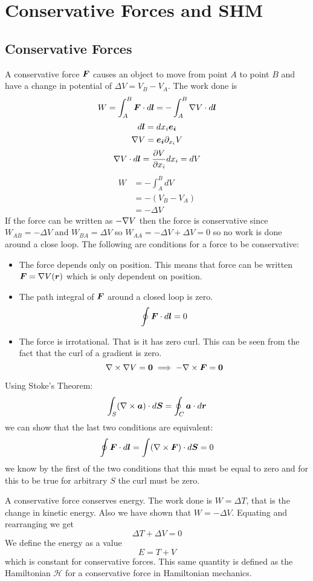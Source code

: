 \documentclass{article}
\newcommand{\pdvx}[1]{\partial_{x_{#1}}}
\begin{document}
    \section{Conservative Forces and SHM}
    \subsection{Conservative Forces}
    A conservative force \(\bm{F}\) causes an object to move from point \(A\) to point \(B\) and have a change in potential of \(\Delta V = V_B - V_A\).
    The work done is
    \[W = \int_A^B\bm{F}\cdot d\bm{l} = -\int_A^B\nabla V\cdot d\bm{l}\]
    \[d\bm{l} = dx_i\bm{e_{i}}\]
    \[\grad V = \ve i\pdvx i V\]
    \[\nabla V\cdot d\bm{l} = \pdv{V}{x_i}dx_i = dV\]
    \begin{align*}
        W &= -\int_A^B dV\\
        &= -(V_B - V_A)\\
        &= -\Delta V
    \end{align*}
    If the force can be written as \(-\nabla V\) then the force is conservative since \(W_{AB} = -\Delta V\) and \(W_{BA} = \Delta V\) so \(W_{AA} = -\Delta V + \Delta V = 0\) so no work is done around a close loop.
    The following are conditions for a force to be conservative:
    \begin{itemize}
        \item The force depends only on position.
        This means that force can be written \(\bm{F} = \nabla V(\bm{r})\) which is only dependent on position.
        \item The path integral of \(\bm{F}\) around a closed loop is zero.
        \[\oint \bm{F}\cdot d\bm{l} = 0\]
        \item The force is irrotational.
        That is it has zero curl.
        This can be seen from the fact that the curl of a gradient is zero.
        \[\nabla\times\nabla V = \bm{0} \implies -\nabla\times\bm{F} = \bm{0}\]
    \end{itemize}
    Using Stoke's Theorem:
    \[\int_S (\nabla\times\bm{a})\cdot d\bm{S} = \oint_C \bm{a}\cdot d\bm{r}\]
    we can show that the last two conditions are equivalent:
    \[\oint \bm{F}\cdot d\bm{l} = \int (\nabla\times\bm{F})\cdot d\bm{S} = 0\]
    we know by the first of the two conditions that this must be equal to zero and for this to be true for arbitrary \(S\) the curl must be zero.
    
    A conservative force conserves energy.
    The work done is \(W = \Delta T\), that is the change in kinetic energy.
    Also we have shown that \(W = -\Delta V\).
    Equating and rearranging we get
    \[\Delta T + \Delta V = 0\]
    We define the energy as a value
    \[E = T + V\]
    which is constant for conservative forces.
    This same quantity is defined as the Hamiltonian \(\mathcal H\) for a conservative force in Hamiltonian mechanics.
    
\end{document}

